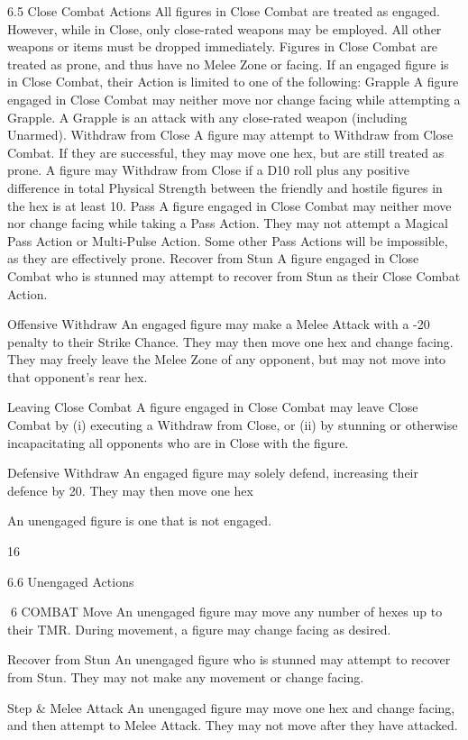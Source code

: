 \documentclass[a4paper]{article}
\begin{document}
\begin{multicols}{3}
6.5 Close Combat Actions
All figures in Close Combat are treated as engaged.
However, while in Close, only close-rated weapons
may be employed. All other weapons or items must
be dropped immediately. Figures in Close Combat
are treated as prone, and thus have no Melee Zone
or facing.
If an engaged figure is in Close Combat, their
Action is limited to one of the following:
Grapple
A figure engaged in Close Combat may neither
move nor change facing while attempting a Grapple. A Grapple is an attack with any close-rated
weapon (including Unarmed).
Withdraw from Close
A figure may attempt to Withdraw from Close
Combat. If they are successful, they may move one
hex, but are still treated as prone. A figure may
Withdraw from Close if a D10 roll plus any positive difference in total Physical Strength between
the friendly and hostile figures in the hex is at least
10.
Pass
A figure engaged in Close Combat may neither
move nor change facing while taking a Pass Action. They may not attempt a Magical Pass Action
or Multi-Pulse Action. Some other Pass Actions
will be impossible, as they are effectively prone.
Recover from Stun
A figure engaged in Close Combat who is stunned
may attempt to recover from Stun as their Close
Combat Action.

Offensive Withdraw
An engaged figure may make a Melee Attack with
a -20 penalty to their Strike Chance. They may
then move one hex and change facing. They may
freely leave the Melee Zone of any opponent, but
may not move into that opponent’s rear hex.

Leaving Close Combat
A figure engaged in Close Combat may leave
Close Combat by (i) executing a Withdraw from
Close, or (ii) by stunning or otherwise incapacitating all opponents who are in Close with the figure.

Defensive Withdraw
An engaged figure may solely defend, increasing
their defence by 20. They may then move one hex

An unengaged figure is one that is not engaged.

16

6.6 Unengaged Actions

6 COMBAT
Move
An unengaged figure may move any number of
hexes up to their TMR. During movement, a figure
may change facing as desired.

Recover from Stun
An unengaged figure who is stunned may attempt
to recover from Stun. They may not make any
movement or change facing.

Step & Melee Attack
An unengaged figure may move one hex and
change facing, and then attempt to Melee Attack.
They may not move after they have attacked.


\end{multicols}
\end{document}
